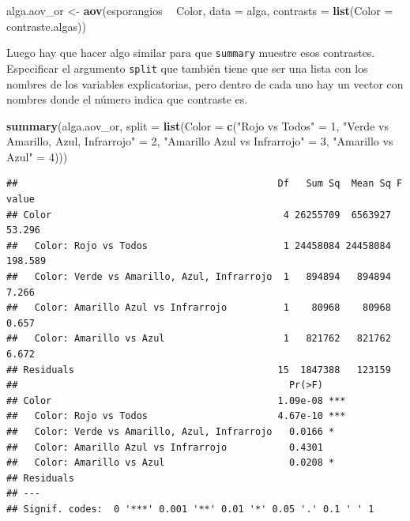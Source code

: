 \documentclass[]{book}
\newenvironment{Shaded}{\begin{snugshade}}{\end{snugshade}}
\newcommand{\DataTypeTok}[1]{\textcolor[rgb]{0.13,0.29,0.53}{#1}}
\newcommand{\DecValTok}[1]{\textcolor[rgb]{0.00,0.00,0.81}{#1}}
\newcommand{\KeywordTok}[1]{\textcolor[rgb]{0.13,0.29,0.53}{\textbf{#1}}}
\newcommand{\NormalTok}[1]{#1}
\newcommand{\OperatorTok}[1]{\textcolor[rgb]{0.81,0.36,0.00}{\textbf{#1}}}
\newcommand{\StringTok}[1]{\textcolor[rgb]{0.31,0.60,0.02}{#1}}
\theoremstyle{definition}
\theoremstyle{definition}
\theoremstyle{definition}
\theoremstyle{remark}
\begin{document}
\begin{Shaded}
\begin{Highlighting}[]
\NormalTok{alga.aov_or <-}\StringTok{ }\KeywordTok{aov}\NormalTok{(esporangios }\OperatorTok{~}\StringTok{ }\NormalTok{Color, }\DataTypeTok{data =}\NormalTok{ alga, }
                      \DataTypeTok{contrasts =} \KeywordTok{list}\NormalTok{(}\DataTypeTok{Color =}\NormalTok{ contraste.algas))}
\end{Highlighting}
\end{Shaded}

Luego hay que hacer algo similar para que \texttt{summary} muestre esos
contrastes. Especificar el argumento \texttt{split} que también tiene
que ser una lista con los nombres de los variables explicatorias, pero
dentro de cada uno hay un vector con nombres donde el número indica que
contraste es.

\begin{Shaded}
\begin{Highlighting}[]
\KeywordTok{summary}\NormalTok{(alga.aov_or, }\DataTypeTok{split =} \KeywordTok{list}\NormalTok{(}\DataTypeTok{Color =} \KeywordTok{c}\NormalTok{(}\StringTok{"Rojo vs Todos"}\NormalTok{ =}\StringTok{ }\DecValTok{1}\NormalTok{,}
                                            \StringTok{"Verde vs Amarillo, Azul, Infrarrojo"}\NormalTok{  =}\StringTok{ }\DecValTok{2}\NormalTok{,}
                                            \StringTok{"Amarillo Azul vs Infrarrojo"}\NormalTok{ =}\StringTok{ }\DecValTok{3}\NormalTok{,}
                                            \StringTok{"Amarillo vs Azul"}\NormalTok{ =}\StringTok{ }\DecValTok{4}\NormalTok{)))}
\end{Highlighting}
\end{Shaded}

\begin{verbatim}
##                                              Df   Sum Sq  Mean Sq F value
## Color                                         4 26255709  6563927  53.296
##   Color: Rojo vs Todos                        1 24458084 24458084 198.589
##   Color: Verde vs Amarillo, Azul, Infrarrojo  1   894894   894894   7.266
##   Color: Amarillo Azul vs Infrarrojo          1    80968    80968   0.657
##   Color: Amarillo vs Azul                     1   821762   821762   6.672
## Residuals                                    15  1847388   123159        
##                                                Pr(>F)    
## Color                                        1.09e-08 ***
##   Color: Rojo vs Todos                       4.67e-10 ***
##   Color: Verde vs Amarillo, Azul, Infrarrojo   0.0166 *  
##   Color: Amarillo Azul vs Infrarrojo           0.4301    
##   Color: Amarillo vs Azul                      0.0208 *  
## Residuals                                                
## ---
## Signif. codes:  0 '***' 0.001 '**' 0.01 '*' 0.05 '.' 0.1 ' ' 1
\end{verbatim}
\end{document}
